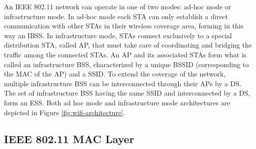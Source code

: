An IEEE 802.11 network can operate in one of two modes: ad-hoc mode or infrastructure mode. In ad-hoc mode each \gls{STA} can only establish a direct communication with other \glspl{STA} in their wireless coverage area, forming in this way an \gls{IBSS}. In infrastructure mode, \glspl{STA} connect exclusively to a special distribution \gls{STA}, called \gls{AP}, that must take care of coordinating and bridging the traffic among the connected \glspl{STA}. An \gls{AP} and its associated \glspl{STA} form what is called an infrastructure \gls{BSS}, characterized by a unique \gls{BSSID} (corresponding to the MAC of the \gls{AP}) and a \gls{SSID}. To extend the coverage of the network, multiple infrastructure \gls{BSS} can be interconnected through their \glspl{AP} by a \gls{DS}. The set of infrastructure \gls{BSS} having the same \gls{SSID} and interconnected by a \gls{DS}, form an \gls{ESS}.
Both ad hoc mode and infrastructure mode architectures are depicted in Figure \ref{fig:wifi-architecture}.

\subsection{IEEE 802.11 MAC Layer}

